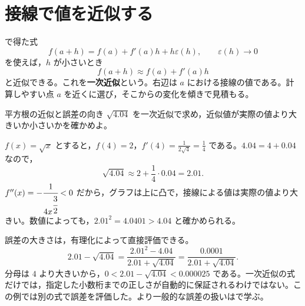 \section{接線で値を近似する}\label{節:一次近似}
で得た式
\[
 f(a+h)=f(a)+f'(a)h+h\varepsilon(h),\qquad \varepsilon(h)\to0
\]
を使えば，$h$ が小さいとき
\[
 f(a+h)\approx f(a)+f'(a)h
\]
と近似できる。これを\textbf{一次近似}という。右辺は $a$ における接線の値である。計算しやすい点 $a$ を近くに選び，そこからの変化を傾きで見積もる。

\begin{example}{平方根の近似と誤差の向き}
$\sqrt{4.04}$ を一次近似で求め，近似値が実際の値より大きいか小さいかを確かめよ。
\end{example}
$f(x)=\sqrt{x}$ とすると，$f(4)=2$，$f'(4)=\frac1{2\sqrt4}=\frac14$ である。$4.04=4+0.04$ なので，
\[
 \sqrt{4.04}\approx2+\frac14\cdot0.04=2.01.
\]
$f''(x)=-\cfrac1{4x^{\cfrac32}}<0$ だから，グラフは上に凸で，接線による値は実際の値より大きい。数値によっても，$2.01^2=4.0401>4.04$ と確かめられる。

誤差の大きさは，有理化によって直接評価できる。
\[
 2.01-\sqrt{4.04}
 =\frac{2.01^2-4.04}{2.01+\sqrt{4.04}}
 =\frac{0.0001}{2.01+\sqrt{4.04}}.
\]
分母は $4$ より大きいから，$0<2.01-\sqrt{4.04}<0.000025$ である。一次近似の式だけでは，指定した小数桁までの正しさが自動的に保証されるわけではない。この例では別の式で誤差を評価した。より一般的な誤差の扱いはで学ぶ。

